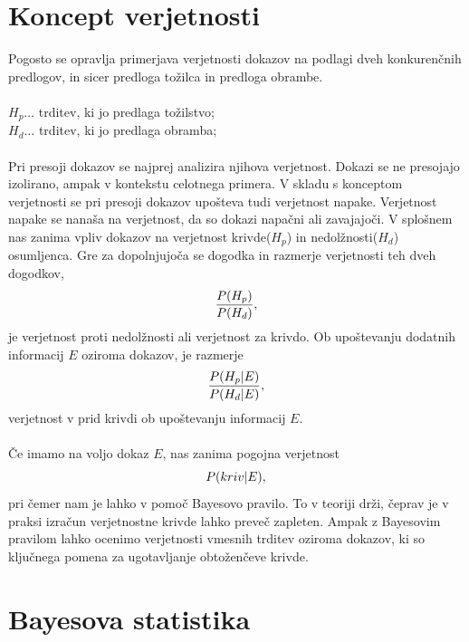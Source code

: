 \documentclass[12pt,a4paper]{amsart}
\theoremstyle{definition} %
\theoremstyle{plain} %
\begin{document}
\section{Koncept verjetnosti}
Pogosto se opravlja primerjava verjetnosti dokazov na podlagi dveh konkurenčnih predlogov, in sicer predloga tožilca in predloga obrambe.\\\\
$H_p \dots$ trditev, ki jo predlaga tožilstvo;\\
$H_d \dots$ trditev, ki jo predlaga obramba;\\\\
Pri presoji dokazov se najprej analizira njihova verjetnost. Dokazi se ne presojajo izolirano, ampak v kontekstu celotnega primera. V skladu s konceptom 
verjetnosti se pri presoji dokazov upošteva tudi verjetnost napake. Verjetnost napake se nanaša na verjetnost, da so dokazi napačni ali zavajajoči. V splošnem 
nas zanima vpliv dokazov na verjetnost krivde($H_p$) in nedolžnosti($H_d$) osumljenca. Gre za dopolnjujoča se dogodka in razmerje verjetnosti teh dveh dogodkov,
\begin{equation}
   \frac{P(H_p)}{P(H_d)}, \vspace{2mm}
\end{equation}
je verjetnost proti nedolžnosti ali verjetnost za krivdo. Ob upoštevanju dodatnih informacij $E$ oziroma dokazov, je razmerje
\begin{equation}
   \frac{P(H_p \lvert E)}{P(H_d \lvert E)} \vspace{2mm},
\end{equation}
verjetnost v prid krivdi ob upoštevanju informacij $E$.\\\\
Če imamo na voljo dokaz $E$, nas zanima pogojna verjetnost
\[
    P(kriv \lvert E), \vspace{2mm}
\]
pri čemer nam je lahko v pomoč Bayesovo pravilo. To v teoriji drži, čeprav je v praksi izračun verjetnostne krivde lahko preveč zapleten. Ampak 
z Bayesovim pravilom lahko ocenimo verjetnosti vmesnih trditev oziroma dokazov, ki so ključnega pomena za ugotavljanje obtoženčeve krivde.

\section{Bayesova statistika}
\end{document}
